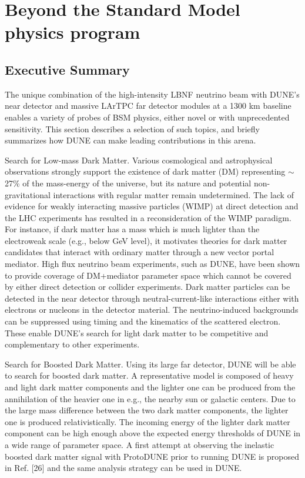 \chapter{Beyond the Standard Model physics program }
\label{ch:bsm}

\section{Executive Summary}
The unique combination of the high-intensity LBNF neutrino beam with DUNE’s near detector and massive LArTPC far detector modules at a 1300 km baseline enables a variety of probes of BSM physics, either novel or with unprecedented sensitivity. This section describes a selection of such topics, and briefly summarizes how DUNE can make leading contributions in this arena.

Search for Low-mass Dark Matter. Various cosmological and astrophysical observations strongly support the existence of dark matter (DM) representing $\sim$27\% of the mass-energy of the universe, but its nature and potential non-gravitational interactions with regular matter remain undetermined. The lack of evidence for weakly interacting massive particles (WIMP) at direct detection and the LHC experiments has resulted in a reconsideration of the WIMP paradigm. For instance, if dark matter has a mass which is much lighter than the electroweak scale (e.g., below GeV level), it motivates theories for dark matter candidates that interact with ordinary matter through a new vector portal mediator. High flux neutrino beam experiments, such as DUNE, have been shown to provide coverage of DM+mediator parameter space which cannot be covered by either direct detection or collider experiments. Dark matter particles can be detected in the near detector through neutral-current-like interactions either with electrons or nucleons in the detector material. The neutrino-induced backgrounds can be suppressed using timing and the kinematics of the scattered electron. These enable DUNE's search for light dark matter to be competitive and complementary to other experiments.

Search for Boosted Dark Matter. Using its large far detector, DUNE will be able to search for boosted dark matter. A representative model is composed of heavy and light dark matter components and the lighter one can be produced from the annihilation of the heavier one in e.g., the nearby sun or galactic centers. Due to the large mass difference between the two dark matter components, the lighter one is produced relativistically. The incoming energy of the lighter dark matter component can be high enough above the expected energy thresholds of DUNE in a wide range of parameter space. A first attempt at observing the inelastic boosted dark matter signal with ProtoDUNE prior to running DUNE is proposed in Ref. [26] and the same analysis strategy can be used in DUNE.

